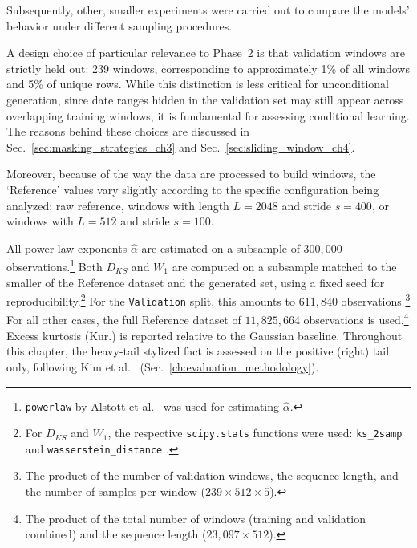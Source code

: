 Subsequently, other, smaller experiments were carried out to compare the models' behavior under different sampling procedures.

A design choice of particular relevance to Phase~2 is that validation windows are strictly held out: 239 windows, corresponding to approximately 1\% of all 
windows and 5\% of unique rows. While this distinction is less critical for unconditional generation, since date ranges hidden in the validation set may still appear across overlapping training windows, it is fundamental for assessing conditional learning. The reasons behind these choices are discussed in Sec.\ \ref{sec:masking_strategies_ch3} 
and Sec.\ \ref{sec:sliding_window_ch4}.

Moreover, because of the way the data are processed to build windows, the `Reference' values vary slightly according to the specific configuration being analyzed: raw reference, windows with length \(L=2048\) and stride \(s=400\), or windows with \(L=512\) and stride \(s=100\).

All power-law exponents $\hat{\alpha}$ are estimated on a subsample of $300{,}000$ observations.\footnote{\texttt{powerlaw} by Alstott et al.\ 
\cite{alstott2014powerlaw} was used for estimating $\hat{\alpha}$.} Both $D_{KS}$ and $W_1$ are computed on a subsample matched to the smaller  of the Reference dataset and the generated set, using a fixed seed for 
reproducibility.\footnote{For $D_{KS}$ and $W_1$, the respective \texttt{scipy.stats} functions were used: \texttt{ks\_2samp} and \texttt{wasserstein\_distance} \cite{virtanen2020scipy}.} For the 
\texttt{Validation} split, this amounts to $611{,}840$ observations \footnote{The product of the number of validation windows, the sequence length, 
and the number of samples per window ($239 \times 512 \times 5$).}
For all other cases, the full Reference dataset of $11{,}825{,}664$ 
observations is used.\footnote{The product of the total number of windows 
(training and validation combined) and the sequence length 
($23{,}097 \times 512$).} Excess kurtosis (Kur.) is reported relative to the Gaussian baseline. Throughout this chapter, the heavy-tail stylized fact is assessed on the positive (right) tail only, following Kim et al.\ \cite{kim2025diffusion} (Sec.\ \ref{ch:evaluation_methodology}).

